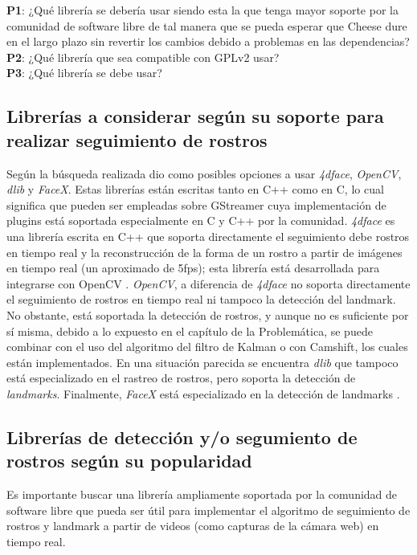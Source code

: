 \documentclass[a4paper,openright,12pt]{report}
\begin{document}
\noindent
\textbf{P1}: ¿Qué librería se debería usar siendo esta la que tenga mayor soporte
por la comunidad de software libre de tal manera que se pueda esperar que
Cheese dure en el largo plazo sin revertir los cambios debido a problemas en
las dependencias?\\
\textbf{P2}: ¿Qué librería que sea compatible con GPLv2 usar?\\
\textbf{P3}: ¿Qué librería se debe usar?

\subsection{Librerías a considerar según su soporte para realizar seguimiento
						de rostros}
Según la búsqueda realizada dio como posibles opciones a usar \textit{4dface},
\textit{OpenCV}, \textit{dlib} y \textit{FaceX}. Estas librerías están escritas
tanto en C++ como en C, lo cual significa que pueden ser empleadas sobre
GStreamer cuya implementación de plugins está soportada especialmente en C y C++
por la comunidad.
\textit{4dface} es una librería escrita en C++ que soporta directamente el
seguimiento debe rostros en tiempo real y la reconstrucción de la forma de un
rostro a partir de imágenes en tiempo real (un aproximado de 5fps); esta librería
está desarrollada para integrarse con OpenCV \cite{4dface}. \textit{OpenCV}, a
diferencia de \textit{4dface} no soporta directamente el seguimiento de rostros
en tiempo real ni tampoco la detección del landmark. No obstante, está soportada
la detección de rostros, y aunque no es suficiente por sí misma, debido a lo
expuesto en el capítulo de la Problemática, se puede combinar con el uso del
algoritmo del filtro de Kalman o con Camshift, los cuales están implementados.
En una situación parecida se encuentra \textit{dlib} que tampoco está
especializado en el rastreo de rostros, pero soporta la detección de
\textit{\glspl{landmark}}. Finalmente, \textit{FaceX} está especializado en la
detección de \glspl{landmark} \cite{FaceX}.

\subsection{Librerías de detección y/o segumiento de rostros según su
            popularidad}
Es importante buscar una librería ampliamente soportada por la comunidad de
software libre que pueda ser útil para implementar el algoritmo de seguimiento
de rostros y landmark a partir de videos (como capturas de la cámara web) en
tiempo real.
\end{document}
